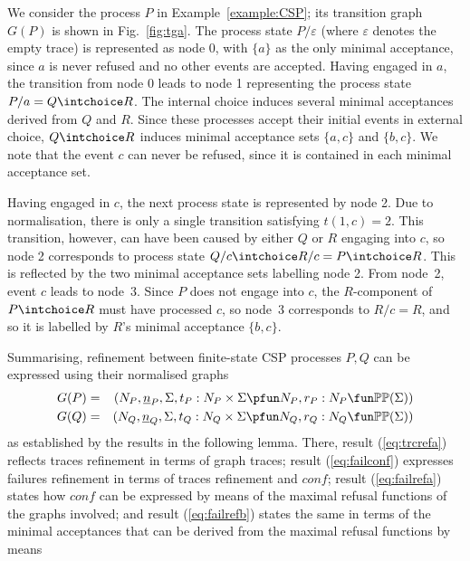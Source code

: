 \begin{example}\label{ex:a}
We consider the process $P$ in Example~\ref{example:CSP}; its transition
graph $G(P)$ is shown in Fig.~\ref{fig:tga}. The process state
$P/\varepsilon$ (where $\varepsilon$ denotes the empty trace) is represented
as node 0, with $\{ a\}$ as the only minimal acceptance, since $a$ is never
refused and no other events are accepted. Having engaged in $a$, the
transition from node 0 leads to node 1 representing the process state $P/a
= Q\intchoice R$. The internal choice induces several minimal acceptances
derived from $Q$ and $R$. Since these processes accept their initial events
in external choice, $Q\intchoice R$ induces minimal acceptance sets $\{a,c\}$
and $\{b,c\}$. We note that the event $c$ can never be refused, since it is
contained in each minimal acceptance set.

Having engaged in $c$, the next process state is represented by node 2. Due
to normalisation, there is only a single transition satisfying $t(1,c) = 2$.
This transition, however, can have been caused by either $Q$ or $R$ engaging
into $c$, so node 2 corresponds to process state $Q/c \intchoice R/c = P
\intchoice R$. This is reflected by the two minimal acceptance sets labelling
node 2. From node~2, event $c$ leads to node~3. Since $P$ does not engage
into $c$, the $R$-component of $P\intchoice R$ must have processed $c$, so
node~3 corresponds to $R/c = R$, and so it is labelled by $R$'s minimal
acceptance $\{b,c\}$. \xbox
\end{example}
%
\noindent%
Summarising, refinement between finite-state CSP processes $P, Q$ can be
expressed using their normalised graphs
\begin{eqnarray*}
G(P) & = & ( N_P, {\ii n}_P, \Sigma, t_P : N_P\times\Sigma \pfun N_P, r_P : N_P \fun \mathbb{P}\mathbb{P}(\Sigma))
\\
G(Q) & = & ( N_Q, {\ii n}_Q, \Sigma, t_Q : N_Q\times\Sigma \pfun N_Q, r_Q : N_Q \fun \mathbb{P}\mathbb{P}(\Sigma))
\end{eqnarray*}
%
as established by the results  in the following lemma. There, result
(\ref{eq:trcrefa}) reflects traces refinement in terms of graph traces;
result (\ref{eq:failconf}) expresses failures refinement in terms of traces
refinement and $conf$; result (\ref{eq:failrefa}) states how $conf$ can be
expressed by means of the maximal refusal functions of the graphs involved;
and result (\ref{eq:failrefb}) states the same in terms of the minimal
acceptances that can be derived from the maximal refusal functions by means
